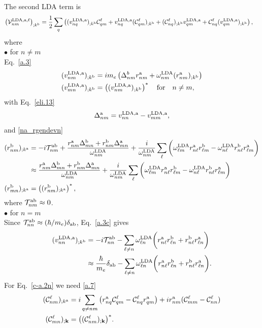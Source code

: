  The second LDA term is
\begin{align}\label{c-a.2n}
\left({\mathbf{\cal V}}^{\mathrm{LDA},\mathrm{a},\ell}_{nm}\right)_{;k^{\mathrm{b}}}
&=
\frac{1}{2}\sum_q\left(
(v^{\mathrm{LDA},\mathrm{a}}_{nq})_{;k^{\mathrm{b}}}{\mathbf{\cal C}}^\ell_{qm}
+  
v^{\mathrm{LDA},\mathrm{a}}_{nq}({\mathbf{\cal C}}^\ell_{qm})_{;k^{\mathrm{b}}}
+
({\mathbf{\cal C}}^\ell_{nq})_{;k^{\mathrm{b}}} v^{\mathrm{LDA},\mathrm{a}}_{qm}
+
{\mathbf{\cal C}}^\ell_{nq} (v^{\mathrm{LDA},\mathrm{a}}_{qm})_{;k^{\mathrm{b}}}
\right)
,
\end{align}  
where\\
$\bullet$ for $n\ne m$\\
Eq.~\eqref{a.3}
\begin{align}\label{c-a.3}
(v^{\mathrm{LDA},\mathrm{a}}_{nm})_{;k^{\mathrm{b}}}
&=  
im_e\left(\Delta^b_{nm}r^{\mathrm{a}}_{nm}
+ 
\omega^{\mathrm{LDA}}_{nm}(r^{\mathrm{a}}_{nm})_{;k^{\mathrm{b}}}
\right)
\nonumber\\
(v^{\mathrm{LDA},\mathrm{a}}_{mn})_{;k^{\mathrm{b}}}
&=
\left((v^{\mathrm{LDA},\mathrm{a}}_{nm})_{;k^{\mathrm{b}}}\right)^*
\quad\mathrm{for}\quad n\ne m
,
\end{align} 
with
Eq.~\eqref{eli.13}
\begin{align}\label{c-eli.13}
\Delta_{nm}^{\mathrm{a}}
=
v_{nn}^{\mathrm{LDA},\mathrm{a}}-v_{mm}^{\mathrm{LDA},\mathrm{a}}
,
\end{align}
and \eqref{na_rgendevn}
\begin{align}\label{c-na_rgendevn}
(r^{\mathrm{b}}_{nm})_{;k^{\mathrm{a}}}
&=
-i{\cal T}^{\mathrm{a}\mathrm{b}}_{nm}
+
\frac{
r^{\mathrm{a}}_{nm}
\Delta^{\mathrm{b}}_{mn}
+r^{\mathrm{b}}_{nm}
\Delta^{\mathrm{a}}_{mn}
}
{\omega^{\mathrm{LDA}}_{nm}}
+
\frac{i}{\omega^{\mathrm{LDA}}_{nm}}
\sum_{\ell}
\bigg(
\omega^{\mathrm{LDA}}_{\ell m}
r^{\mathrm{a}}_{n\ell}
r^{\mathrm{b}}_{\ell m}
-
\omega^{\mathrm{LDA}}_{n\ell}
r^{\mathrm{b}}_{n\ell}
r^{\mathrm{a}}_{\ell m}
\bigg)
\nonumber\\
&\approx
\frac{
r^{\mathrm{a}}_{nm}
\Delta^{\mathrm{b}}_{mn}
+r^{\mathrm{b}}_{nm}
\Delta^{\mathrm{a}}_{mn}
}
{\omega^{\mathrm{LDA}}_{nm}}
+
\frac{i}{\omega^{\mathrm{LDA}}_{nm}}
\sum_{\ell}
\bigg(
\omega^{\mathrm{LDA}}_{\ell m}
r^{\mathrm{a}}_{n\ell}
r^{\mathrm{b}}_{\ell m}
-
\omega^{\mathrm{LDA}}_{n\ell}
r^{\mathrm{b}}_{n\ell}
r^{\mathrm{a}}_{\ell m}
\bigg)
\nonumber\\
(r^{\mathrm{b}}_{mn})_{;k^{\mathrm{a}}}
&=
\left((r^{\mathrm{b}}_{nm})_{;k^{\mathrm{a}}}\right)^*
,
\end{align}
where ${\cal T}^{\mathrm{a}\mathrm{b}}_{nm}\approx 0$.\\
$\bullet$ for $n=m$\\
Since 
${\cal T}^{\mathrm{a}\mathrm{b}}_{nn}\approx (\hbar/m_e)\delta_{\mathrm{a}\mathrm{b}}$,
Eq.~\eqref{a.3c} gives
\begin{align}\label{c-a.3c}
(v^{\mathrm{LDA},\mathrm{a}}_{nn})_{;k^{\mathrm{b}}}
&=
-i{\cal T}^{\mathrm{a}\mathrm{b}}_{nn}
-
\sum_{\ell\ne n}
\omega^{\mathrm{LDA}}_{\ell n}
\bigg( 
r^{\mathrm{a}}_{n\ell} 
r^{\mathrm{b}}_{\ell n}
+ 
r^{\mathrm{b}}_{n\ell} 
r^{\mathrm{a}}_{\ell n}
\bigg)
\nonumber\\
&\approx
\frac{\hbar}{m_e}\delta_{\mathrm{a}\mathrm{b}}
-
\sum_{\ell\ne n}
\omega^{\mathrm{LDA}}_{\ell n}
\bigg( 
r^{\mathrm{a}}_{n\ell} 
r^{\mathrm{b}}_{\ell n}
+ 
r^{\mathrm{b}}_{n\ell} 
r^{\mathrm{a}}_{\ell n}
\bigg)
.
\end{align} 
For Eq.~\eqref{c-a.2n} we need
\eqref{a.7}
\begin{align}\label{c-a.7}
 ({\mathbf{\cal C}}^\ell_{nm})_{;k^{\mathrm{a}}}
&= 
i\sum_{q\ne nm}
\left(
r_{nq}^{\mathrm{a}}
{\mathbf{\cal C}}^\ell_{qm}
-
{\mathbf{\cal C}}^\ell_{nq}
r_{qm}^{\mathrm{a}}
\right)
+ir_{nm}^{\mathrm{a}}({\mathbf{\cal C}}^\ell_{mm}-{\mathbf{\cal C}}^\ell_{nn})
\nonumber\\
 ({\mathbf{\cal C}}^\ell_{mn})_{;\mathbf{k}}
&=
\big( ({\mathbf{\cal C}}^\ell_{nm})_{;\mathbf{k}}\big)^*
.
\end{align} 

